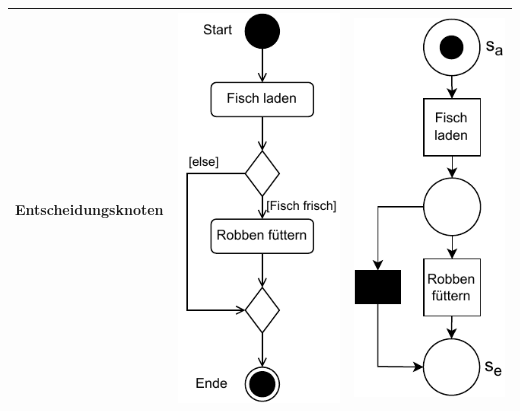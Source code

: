 \begin{longtable}{p{\sttpHilfA}|c|c}
		\hline %
		
			\parbox{\sttpHilfA}{\centering
				Entscheidungs\-knoten} 
		&  
			\parbox{\sttpHilfB}{\centering
				\vspace{\sttpAbstandRand}
				\includegraphics[scale=\sttpFaktor]{Bilder/Kapitel-5/gegenueberstellung_7a.pdf}
				\vspace{\sttpAbstandRand}
			} 
		& 
			\parbox{\sttpHilfB}{\centering
				\vspace{\sttpAbstandRand}
				\includegraphics[scale=\sttpFaktor]{Bilder/Kapitel-5/gegenueberstellung_7b.pdf}
				\vspace{\sttpAbstandRand}
			} 
		\\
		
		\hline %
	\end{longtable}

\endgroup
